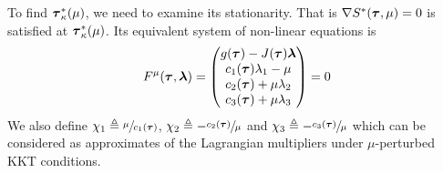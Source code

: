 \documentclass[../main.tex]{subfiles}
\begin{document}
To find $\boldsymbol{\tau}^*_{\kappa}(\mu)$, we need to examine its stationarity. That is $\nabla S^*(\boldsymbol{\tau}, \mu) = 0$ is satisfied at $\boldsymbol{\tau}^*_{\kappa}(\mu)$. Its equivalent system of non-linear equations is
\begin{align*}
F^{\mu}(\boldsymbol{\tau}, \boldsymbol{\lambda}) = 
\begin{pmatrix} g(\boldsymbol{\tau}) - J(\boldsymbol{\tau}) \boldsymbol{\lambda} \\ c_1( \boldsymbol{\tau}) \lambda_1 - \mu \\ c_2(\boldsymbol{\tau}) + \mu \lambda_2\\ c_3(\boldsymbol{\tau}) + \mu \lambda_3 \end{pmatrix} = 0
\end{align*}
We also define $\chi_1 \triangleq \sfrac{\mu}{c_1(\boldsymbol{\tau})}$, $\chi_2 \triangleq - \sfrac{c_2(\boldsymbol{\tau})}{\mu}$ and $\chi_3 \triangleq - \sfrac{c_3(\boldsymbol{\tau})}{\mu}$ which can be considered as approximates of the Lagrangian multipliers under  $\mu$-perturbed KKT conditions. \\
\end{document}
